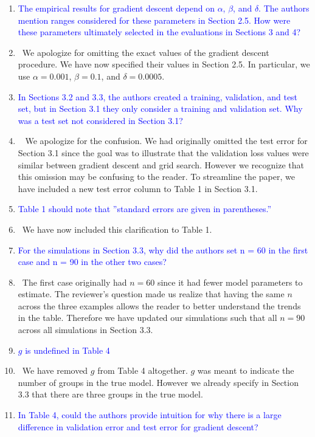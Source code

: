 \documentclass[]{article}
\newcommand{\point}[1]{\item \textcolor{blue}{#1}}
\newcommand{\reply}{\item[]\ }
\begin{document}
\begin{enumerate}
		\point{The empirical results for gradient descent depend on $\alpha$, $\beta$, and $\delta$. The authors mention ranges considered for these parameters in Section 2.5. How were these parameters ultimately selected in the evaluations in Sections 3 and 4?}
		
		\reply We apologize for omitting the exact values of the gradient descent procedure. We have now specified their values in Section 2.5. In particular, we use $\alpha = 0.001$, $\beta = 0.1$, and $\delta = 0.0005$.
		
		\point{In Sections 3.2 and 3.3, the authors created a training, validation, and test set, but in Section 3.1 they only consider a training and validation set. Why was a test set not considered in Section 3.1?}
		
		\reply 
		We apologize for the confusion. We had originally omitted the test error for Section 3.1 since the goal was to illustrate that the validation loss values were similar between gradient descent and grid search. However we recognize that this omission may be confusing to the reader. To streamline the paper, we have included a new test error column to Table 1 in Section 3.1.
		
		\point{Table 1 should note that ”standard errors are given in parentheses.”}
		
		\reply We have now included this clarification to Table 1.
		
		\point{For the simulations in Section 3.3, why did the authors set n = 60 in the first case and
n = 90 in the other two cases?}
		
		\reply The first case originally had $n = 60$ since it had fewer model parameters to estimate. The reviewer's question made us realize that having the same $n$ across the three examples allows the reader to better understand the trends in the table. Therefore we have updated our simulations such that all $n = 90$ across all simulations in Section 3.3.
		
		\point{$g$ is undefined in Table 4}
		
		\reply We have removed $g$ from Table 4 altogether. $g$ was meant to indicate the number of groups in the true model. However we already specify in Section 3.3 that there are three groups in the true model.
		
		\point{In Table 4, could the authors provide intuition for why there is a large difference in validation error and test error for gradient descent?}
		

\end{enumerate}
\end{document}
